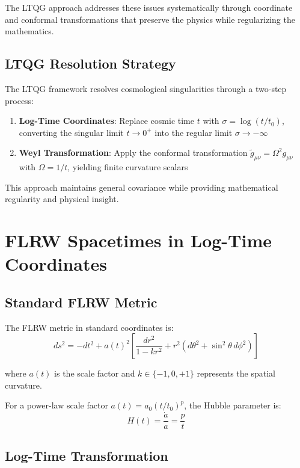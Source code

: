 \documentclass[11pt,a4paper]{article}
\begin{document}
The LTQG approach addresses these issues systematically through coordinate and conformal transformations that preserve the physics while regularizing the mathematics.

\subsection{LTQG Resolution Strategy}

The LTQG framework resolves cosmological singularities through a two-step process:

\begin{enumerate}
\item \textbf{Log-Time Coordinates}: Replace cosmic time $t$ with $\sigma = \log(t/t_0)$, converting the singular limit $t \to 0^+$ into the regular limit $\sigma \to -\infty$

\item \textbf{Weyl Transformation}: Apply the conformal transformation $\tilde{g}_{\mu\nu} = \Omega^2 g_{\mu\nu}$ with $\Omega = 1/t$, yielding finite curvature scalars
\end{enumerate}

This approach maintains general covariance while providing mathematical regularity and physical insight.

\section{FLRW Spacetimes in Log-Time Coordinates}

\subsection{Standard FLRW Metric}

The FLRW metric in standard coordinates is:
\begin{equation}
ds^2 = -dt^2 + a(t)^2 \left[\frac{dr^2}{1-kr^2} + r^2(d\theta^2 + \sin^2\theta \, d\phi^2)\right]
\end{equation}

where $a(t)$ is the scale factor and $k \in \{-1, 0, +1\}$ represents the spatial curvature.

For a power-law scale factor $a(t) = a_0 (t/t_0)^p$, the Hubble parameter is:
\begin{equation}
H(t) = \frac{\dot{a}}{a} = \frac{p}{t}
\end{equation}

\subsection{Log-Time Transformation}
\end{document}
